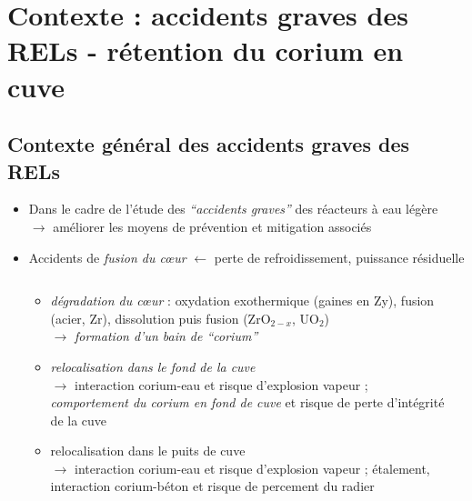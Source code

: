 \section{Contexte : accidents graves des RELs - rétention du corium en cuve}
\subsection{Contexte général des accidents graves des RELs}
\begin{frame}[fragile]
\begin{itemize}
  \item Dans le cadre de l'étude des \emph{``accidents graves''} des réacteurs à eau légère \\ $\rightarrow$ améliorer les moyens de prévention et mitigation associés
  \item Accidents de \emph{fusion du c\oe ur} $\leftarrow$ perte de refroidissement, puissance résiduelle
  \begin{columns}[T]
  \begin{column}{0.7\textwidth}
    \begin{itemize}
      \item \emph{dégradation du c\oe ur} : oxydation exothermique (gaines en Zy), fusion (acier, Zr), dissolution puis fusion (ZrO$_{2-x}$, UO$_2$) \\ $\rightarrow$ \emph{formation d'un bain de ``corium''}
      \item \emph{relocalisation dans le fond de la cuve} \\ $\rightarrow$ interaction corium-eau et risque d'explosion vapeur ; \emph{comportement du corium en fond de cuve}  et risque de perte d'intégrité de la cuve
      \item relocalisation dans le puits de cuve \\ $\rightarrow$ interaction corium-eau  et risque d'explosion vapeur ; étalement, interaction corium-béton et risque de percement du radier
    \end{itemize}
  \end{column}
  \begin{column}{0.25\textwidth}

\end{column}
\end{columns}
\end{itemize}
\end{frame}
